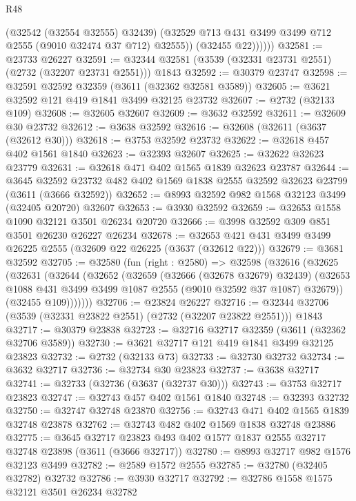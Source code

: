 \begin{lexlean}{R48}
\begin{coremodule}
                (@32542 (@32554 @32555) @32439)
                (@32529 @713 @431 @3499 @3499 @712 @2555 (@9010 @32474 @37 @712) @32555))
              (@32455 @22))))))
@32581 := @23733 @26227
@32591 := @32344 @32581 (@3539 (@32331 @23731 @2551) (@2732 (@32207 @23731 @2551))) @1843
@32592 := @30379 @23747
@32598 := @32591 @32592 @32359 (@3611 (@32362 @32581 @3589))
@32605 := @3621 @32592 @121 @419 @1841 @3499 @32125 @23732
@32607 := @2732 (@32133 @109)
@32608 := @32605 @32607
@32609 := @3632 @32592
@32611 := @32609 @30 @23732
@32612 := @3638 @32592
@32616 := @32608 (@32611 (@3637 (@32612 @30)))
@32618 := @3753 @32592 @23732
@32622 := @32618 @457 @402 @1561 @1840
@32623 := @32393 @32607
@32625 := @32622 @32623 @23779
@32631 := @32618 @471 @402 @1565 @1839 @32623 @23787
@32644 := @3645
    @32592
    @23732
    @482
    @402
    @1569
    @1838
    @2555
    @32592
    @32623
    @23799
    (@3611 (@3666 @32592))
@32652 := @8993 @32592 @982 @1568 @32123 @3499 (@32405 @20720) @32607
@32653 := @3930 @32592
@32659 := @32653 @1558 @1090 @32121 @3501 @26234 @20720
@32666 := @3998 @32592 @309 @851 @3501 @26230 @26227 @26234
@32678 := @32653 @421 @431 @3499 @3499 @26225 @2555 (@32609 @22 @26225 (@3637 (@32612 @22)))
@32679 := @3681 @32592
@32705 := @32580
    (fun (right : @2580) =>
    @32598
      (@32616
        (@32625
          (@32631
            (@32644
              (@32652
                (@32659
                  (@32666 (@32678 @32679) @32439)
                  (@32653 @1088 @431 @3499 @3499 @1087 @2555 (@9010 @32592 @37 @1087) @32679))
                (@32455 @109)))))))
@32706 := @23824 @26227
@32716 := @32344 @32706 (@3539 (@32331 @23822 @2551) (@2732 (@32207 @23822 @2551))) @1843
@32717 := @30379 @23838
@32723 := @32716 @32717 @32359 (@3611 (@32362 @32706 @3589))
@32730 := @3621 @32717 @121 @419 @1841 @3499 @32125 @23823
@32732 := @2732 (@32133 @73)
@32733 := @32730 @32732
@32734 := @3632 @32717
@32736 := @32734 @30 @23823
@32737 := @3638 @32717
@32741 := @32733 (@32736 (@3637 (@32737 @30)))
@32743 := @3753 @32717 @23823
@32747 := @32743 @457 @402 @1561 @1840
@32748 := @32393 @32732
@32750 := @32747 @32748 @23870
@32756 := @32743 @471 @402 @1565 @1839 @32748 @23878
@32762 := @32743 @482 @402 @1569 @1838 @32748 @23886
@32775 := @3645
    @32717
    @23823
    @493
    @402
    @1577
    @1837
    @2555
    @32717
    @32748
    @23898
    (@3611 (@3666 @32717))
@32780 := @8993 @32717 @982 @1576 @32123 @3499
@32782 := @2589 @1572 @2555
@32785 := @32780 (@32405 @32782) @32732
@32786 := @3930 @32717
@32792 := @32786 @1558 @1575 @32121 @3501 @26234 @32782

\end{coremodule}
\end{lexlean}
